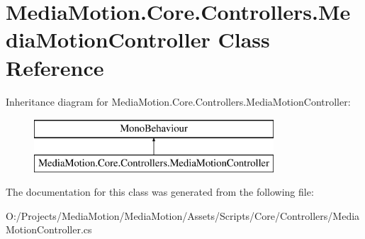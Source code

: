 \hypertarget{class_media_motion_1_1_core_1_1_controllers_1_1_media_motion_controller}{\section{Media\+Motion.\+Core.\+Controllers.\+Media\+Motion\+Controller Class Reference}
\label{class_media_motion_1_1_core_1_1_controllers_1_1_media_motion_controller}
}
Inheritance diagram for Media\+Motion.\+Core.\+Controllers.\+Media\+Motion\+Controller\+:\begin{figure}[H]
\begin{center}
\leavevmode
\includegraphics[height=2.000000cm]{class_media_motion_1_1_core_1_1_controllers_1_1_media_motion_controller}
\end{center}
\end{figure}


The documentation for this class was generated from the following file\+:\begin{DoxyCompactItemize}
\item 
O\+:/\+Projects/\+Media\+Motion/\+Media\+Motion/\+Assets/\+Scripts/\+Core/\+Controllers/Media\+Motion\+Controller.\+cs\end{DoxyCompactItemize}
